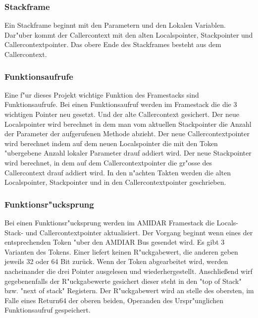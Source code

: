 \subsubsection{Stackframe}
Ein Stackframe beginnt mit den Parametern und den Lokalen Variablen.  Dar"uber kommt der Callercontext mit den alten Localspointer, Stackpointer und Callercontextpointer. Das obere Ende des Stackframes besteht aus dem Callercontext. 

\subsubsection{Funktionsaufrufe}

Eine f"ur dieses Projekt wichtige Funktion des Framestacks sind Funktionsaufrufe. Bei einen Funktionsaufruf werden im Framestack die die 3 wichtigen Pointer neu gesetzt. Und der alte Callercontext gesichert. Der neue Localspointer wird berechnet in dem man vom aktuellen Stackpointer die Anzahl der Parameter der aufgerufenen Methode abzieht. Der neue Callercontextpointer wird berechnet indem auf dem neuen Localspointer die mit den Token "ubergebene Anzahl lokaler Parameter drauf addiert wird. Der neue Stackpointer wird berechnet, in dem auf dem Callercontextpointer die gr"o{ss}e des Callercontext drauf addiert wird. 
In den n"achten Takten werden die alten Localspointer, Stackpointer und in den Callercontextpointer geschrieben. 

\subsubsection{Funktionsr"ucksprung}

Bei einen Funktionsr"ucksprung werden im AMIDAR Framestack die Locals- Stack- und Callercontextpointer aktualisiert. Der Vorgang beginnt wenn eines der entsprechenden Token "uber den AMDIAR Bus gesendet wird. Es gibt 3 Varianten des Tokens. Einer liefert keinen R"uckgabewert, die anderen geben jeweils 32 oder 64 Bit zurück. Wenn der Token abgearbeitet wird, werden nacheinander die drei Pointer ausgelesen und wiederhergestellt. Anschließend wirf gegebenenfalls der R"uckgabewerte gesichert dieser steht in den "top of Stack" bzw. "next of stack" Registern. Der R"uckgabewert wird an stelle des obersten, im Falle eines Return64 der oberen beiden, Operanden des Urspr"unglichen Funktionsaufruf gespeichert. 
